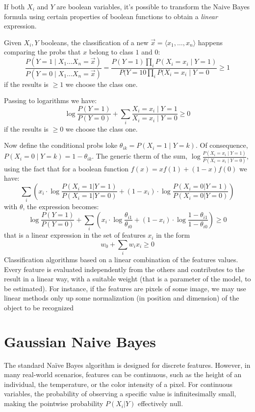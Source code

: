 If both $ X_i $ and $ Y $ are boolean variables, it's possible to transform the Naive Bayes formula using certain properties of boolean functions to obtain a \textit{linear} expression.


Given $X_i, Y$ booleans, the classification of a new $\vec{x} = \langle x_1,\dots, x_n\rangle$ happens comparing the probs that $x$ belong to class $1$ and $0$:
\[
    \frac{P(Y=1 \mid X_1 \dots X_n = \vec{x})}{P(Y=0 \mid X_1 \dots X_n = \vec{x})} = \frac{P(Y=1)\prod_{i}P(X_i = x_i\mid Y=1)}{P(Y=10\prod_{i}P(X_i = x_i\mid Y=0} \geq 1
\] 
if the results is $\geq 1$ we choose the class one.

Passing to logarithms we have:
\[
    \log{\frac{P(Y=1)}{P(Y=0)} + \sum_i\frac{X_i=x_i\mid Y=1}{X_i=x_i\mid Y=0}}\geq 0
\]
if the results is $\geq 0$ we choose the class one. 

Now define the conditional probs loke $\theta_{ik} = P(X_i = 1\mid  Y=k)$. Of consequence, $P(X_i = 0 \mid Y=k)=1-\theta_{ik}$. The generic therm of the sum, $\log{\frac{P(X_i =x_i\mid Y=1)}{P(X_i =x_i\mid Y=0)}}$, using the fact that for a boolean function $f(x)=xf(1)+(1-x)f(0)$ we have:
$$
    \sum_i \left( x_i \cdot \log\frac{P(X_i=1|Y=1)}{P(X_i=1|Y=0)} + (1-x_i) \cdot \log\frac{P(X_i=0|Y=1)}{P(X_i=0|Y=0)} \right)
$$
    with $\theta$, the expression becomes:
$$
    \log\frac{P(Y=1)}{P(Y=0)} + \sum_i \left( x_i \cdot \log\frac{\theta_{i1}}{\theta_{i0}} + (1-x_i) \cdot \log\frac{1-\theta_{i1}}{1-\theta_{i0}} \right) \ge 0
$$
that is a linear expression in the set of features $x_i$ in the form
\[
    w_0 + \sum_i w_i x_i \geq 0
\]
Classification algorithms based on a linear combination of the
features values.
Every feature is evaluated independently from the others and
contributes to the result in a linear way, with a suitable weight
(that is a parameter of the model, to be estimated).
For instance, if the features are pixels of some image, we may use
linear methods only up some normalization (in position and
dimension) of the object to be recognized

\section{Gaussian Naive Bayes}
The standard Naïve Bayes algorithm is designed for discrete features. However, in many real-world scenarios, features can be continuous, such as the height of an individual, the temperature, or the color intensity of a pixel. For continuous variables, the probability of observing a specific value is infinitesimally small, making the pointwise probability $P(X_i | Y)$ effectively null.

